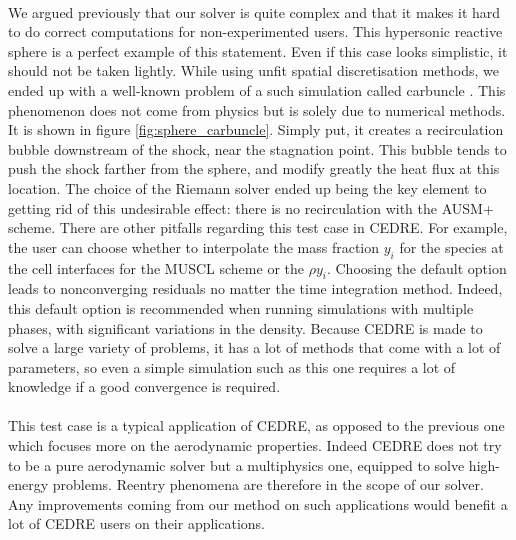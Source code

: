         \paragraph{}
        We argued previously that our solver is quite complex and that it makes it hard to do correct computations for non-experimented users.
        This hypersonic reactive sphere is a perfect example of this statement.
        Even if this case looks simplistic, it should not be taken lightly.
        While using unfit spatial discretisation methods, we ended up with a well-known problem of a such simulation called carbuncle \cite{MacCormack2013}.
        This phenomenon does not come from physics but is solely due to numerical methods.
        It is shown in figure \ref{fig:sphere_carbuncle}.
        Simply put, it creates a recirculation bubble downstream of the shock, near the stagnation point.
        This bubble tends to push the shock farther from the sphere, and modify greatly the heat flux at this location.
        The choice of the Riemann solver ended up being the key element to getting rid of this undesirable effect: there is no recirculation with the AUSM+ scheme.
        There are other pitfalls regarding this test case in CEDRE.
        For example, the user can choose whether to interpolate the mass fraction $y_i$ for the species at the cell interfaces for the MUSCL scheme or the  $\rho y_i$.
        Choosing the default option leads to nonconverging residuals no matter the time integration method.
        Indeed, this default option is recommended when running simulations with multiple phases, with significant variations in the density.
        Because CEDRE is made to solve a large variety of problems, it has a lot of methods that come with a lot of parameters, so even a simple simulation such as this one requires a lot of knowledge if a good convergence is required.

        \paragraph{}
        This test case is a typical application of CEDRE, as opposed to the previous one which focuses more on the aerodynamic properties.
        Indeed CEDRE does not try to be a pure aerodynamic solver but a multiphysics one, equipped to solve high-energy problems.
        Reentry phenomena are therefore in the scope of our solver.
        Any improvements coming from our method on such applications would benefit a lot of CEDRE users on their applications.


